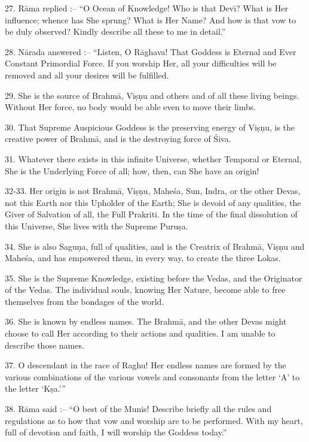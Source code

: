 27. R\=ama replied :-- ``O Ocean of Knowledge! Who is that Dev\={\i}? What is Her influence; whence has She sprung? What is Her Name? And how is that vow to be duly observed? Kindly describe all these to me in detail.''

28. N\=arada answered :-- ``Listen, O R\=aghava! That Goddess is Eternal and Ever Constant Primordial Force. If you worship Her, all your difficulties will be removed and all your desires will be fulfilled.

29. She is the source of Brahm\=a, Vi\d{s}\d{n}u and others and of all these living beings. Without Her force, no body would be able even to move their limbs.

30. That Supreme Auspicious Goddess is the preserving energy of Vi\d{s}\d{n}u, is the creative power of Brahm\=a, and is the destroying force of \'Siva.

31. Whatever there exists in this infinite Universe, whether Temporal or Eternal, She is the Underlying Force of all; how, then, can She have an origin!

32-33. Her origin is not Brahm\=a, Vi\d{s}\d{n}u, Mahe\'sa, Sun, Indra, or the other Devas, not this Earth nor this Upholder of the Earth; She is devoid of any qualities, the Giver of Salvation of all, the Full Prakriti. In the time of the final dissolution of this Universe, She lives with the Supreme Puru\d{s}a.

34. She is also Sagu\d{n}a, full of qualities, and is the Creatrix of Brahm\=a, Vi\d{s}\d{n}u and Mahe\'sa, and has empowered them, in every way, to create the three Lokas.

35. She is the Supreme Knowledge, existing before the Vedas, and the Originator of the Vedas. The individual souls, knowing Her Nature, become able to free themselves from the bondages of the world.

36. She is known by endless names. The Brahm\=a, and the other Devas might choose to call Her according to their actions and qualities. I am unable to describe those names.

37. O descendant in the race of Raghu! Her endless names are formed by the various combinations of the various vowels and consonants from the letter `A' to the letter `K\d{s}a.'''

38. R\=ama said :-- ``O best of the Munis! Describe briefly all the rules and regulations as to how that vow and worship are to be performed. With my heart, full of devotion and faith, I will worship the Goddess today.''

